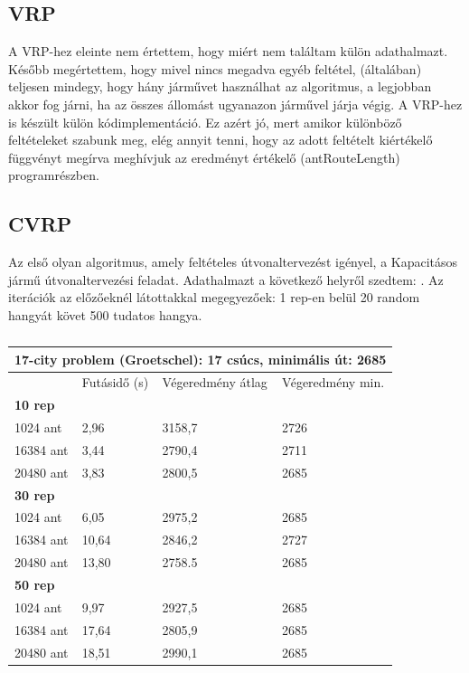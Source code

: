 \subsection{VRP}
A VRP-hez eleinte nem értettem, hogy miért nem találtam külön adathalmazt. Később megértettem, hogy mivel nincs megadva egyéb feltétel, (általában) teljesen mindegy, hogy hány járművet használhat az algoritmus, a legjobban akkor fog járni, ha az összes állomást ugyanazon járművel járja végig. A VRP-hez is készült külön kódimplementáció. Ez azért jó, mert amikor különböző feltételeket szabunk meg, elég annyit tenni, hogy az adott feltételt kiértékelő függvényt megírva meghívjuk az eredményt értékelő (antRouteLength) programrészben.


\subsection{CVRP}
Az első olyan algoritmus, amely feltételes útvonaltervezést igényel, a Kapacitásos jármű útvonaltervezési feladat. Adathalmazt a következő helyről szedtem: \cite{CVRPdataset}.
Az iterációk az előzőeknél látottakkal megegyezőek: 1 rep-en belül 20 random hangyát követ 500 tudatos hangya.


\begin{table}[ht!]
	\centering
	\begin{tabular}{|p{2cm}||p{3cm}|p{3.5cm}|p{3.5cm}|}
		\hline
		\multicolumn{4}{|c|}{17-city problem (Groetschel): 17 csúcs, minimális út: 2685} \\
		\hline
		& Futásidő (s) & Végeredmény átlag & Végeredmény min.\\
		\hline
		\textbf{10 rep} & & & \\
		1024 ant & 2,96 & 3158,7 & 2726  \\
		16384 ant & 3,44 & 2790,4 & 2711 \\
		20480 ant & 3,83 & 2800,5 & 2685 \\
		\hline
		\textbf{30 rep} & & & \\
		1024 ant & 6,05 & 2975,2 & 2685\\
		16384 ant & 10,64 & 2846,2 & 2727 \\
		20480 ant & 13,80 & 2758.5 & 2685 \\
		\hline
		\textbf{50 rep} & & & \\
		1024 ant & 9,97 & 2927,5 & 2685 \\
		16384 ant & 17,64 & 2805,9 & 2685\\
		20480 ant & 18,51 & 2990,1 & 2685\\
		\hline
	\end{tabular}
	\caption{}
	\label{table:CVRP_gr17}
\end{table}

